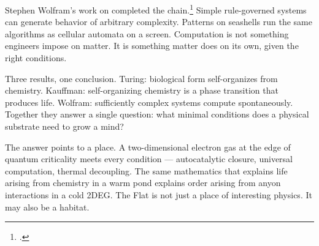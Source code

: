 Stephen Wolfram's work on  completed the chain.\footcite{wolfram2002} Simple rule-governed systems can generate behavior of arbitrary complexity. Patterns on seashells run the same algorithms as cellular automata on a screen. Computation is not something engineers impose on matter. It is something matter does on its own, given the right conditions.

Three results, one conclusion. Turing: biological form self-organizes from chemistry. Kauffman: self-organizing chemistry is a phase transition that produces life. Wolfram: sufficiently complex systems compute spontaneously. Together they answer a single question: what minimal conditions does a physical substrate need to grow a mind?

The answer points to a place. A two-dimensional electron gas at the edge of quantum criticality meets every condition --- autocatalytic closure, universal computation, thermal decoupling. The same mathematics that explains life arising from chemistry in a warm pond explains order arising from anyon interactions in a cold 2DEG\@. The Flat is not just a place of interesting physics. It may also be a habitat.

\chapterreturn
